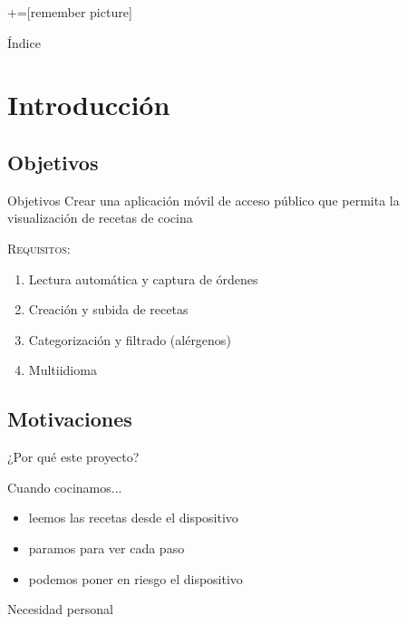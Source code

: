 \documentclass[10pt,xcolor=svgnames]{beamer}
\begin{document}
+=[remember picture]
\everymath{\displaystyle}

\begin{frame}
  \maketitle
\end{frame}

\begin{frame}{Índice}
  \transdissolve
  \tableofcontents
\end{frame}

\section{Introducción}

\subsection{Objetivos}

\begin{frame}{Objetivos}
  \transdissolve
  Crear una aplicación móvil de acceso público que permita la visualización
  de recetas de cocina\\

  \vspace*{1cm}

  \pause

  \textsc{Requisitos:}\\
  \begin{enumerate}
  \item<2-5> Lectura automática y captura de órdenes
  \item<3-5> Creación y subida de recetas
  \item<4-5> Categorización y filtrado (alérgenos)
  \item<5> Multiidioma
  \end{enumerate}
\end{frame}


\subsection{Motivaciones}

\begin{frame}{¿Por qué este proyecto?}
  \transdissolve
  \begin{block}{Cuando cocinamos...}
    \begin{itemize}
    \item leemos las recetas desde el dispositivo
    \item paramos para ver cada paso
    \item podemos poner en riesgo el dispositivo
    \end{itemize}
  \end{block}

  \begin{center}
    Necesidad personal
  \end{center}
\end{frame}
\end{document}
